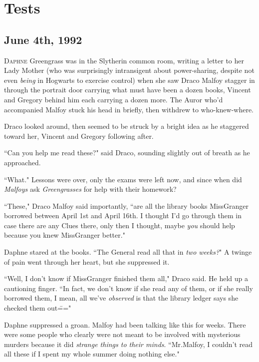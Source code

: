 \chapter{Tests}

\section{June 4th, 1992}

\lettrine{D}{aphne} Greengrass was in the Slytherin common room, writing a letter to her Lady Mother (who was surprisingly intransigent about power-sharing, despite not even \emph{being} in Hogwarts to exercise control) when she saw Draco Malfoy stagger in through the portrait door carrying what must have been a dozen books, Vincent and Gregory behind him each carrying a dozen more. The Auror who'd accompanied Malfoy stuck his head in briefly, then withdrew to who-knew-where.

Draco looked around, then seemed to be struck by a bright idea as he staggered toward her, Vincent and Gregory following after.

``Can you help me read these?" said Draco, sounding slightly out of breath as he approached.

``What." Lessons were over, only the exams were left now, and since when did \emph{Malfoys} ask \emph{Greengrasses} for help with their homework?

``These," Draco Malfoy said importantly, ``are all the library books Miss\?Granger borrowed between April 1st and April 16th. I thought I'd go through them in case there are any Clues there, only then I thought, maybe \emph{you} should help because you knew Miss\?Granger better."

Daphne stared at the books. ``The General read all that in \emph{two weeks?}" A twinge of pain went through her heart, but she suppressed it.

``Well, I don't know if Miss\?Granger finished them all," Draco said. He held up a cautioning finger. ``In fact, we don't know if she read any of them, or if she really borrowed them, I mean, all we've \emph{observed} is that the library ledger says she checked them out\==="

Daphne suppressed a groan. Malfoy had been talking like this for weeks. There were some people who clearly were not meant to be involved with mysterious murders because it did \emph{strange things to their minds}. ``Mr.\?Malfoy, I couldn't read all these if I spent my whole summer doing nothing else."

